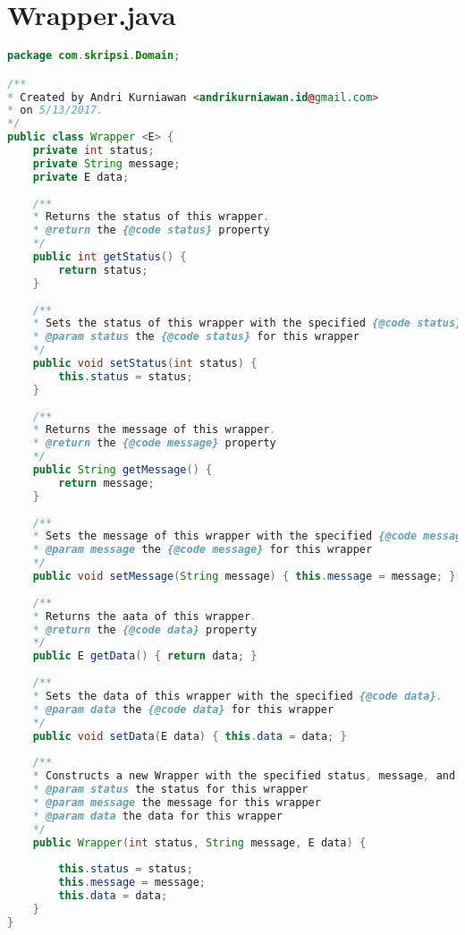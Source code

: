 \section*{Wrapper.java}
\begin{lstlisting}[caption={Berkas Wrapper.java},label={lst:Wrapper},language=Java]
package com.skripsi.Domain;

/**
* Created by Andri Kurniawan <andrikurniawan.id@gmail.com>
* on 5/13/2017.
*/
public class Wrapper <E> {
	private int status;
	private String message;
	private E data;
	
	/**
	* Returns the status of this wrapper.
	* @return the {@code status} property
	*/
	public int getStatus() {
		return status;
	}
	
	/**
	* Sets the status of this wrapper with the specified {@code status}.
	* @param status the {@code status} for this wrapper
	*/
	public void setStatus(int status) {
		this.status = status;
	}
	
	/**
	* Returns the message of this wrapper.
	* @return the {@code message} property
	*/
	public String getMessage() {
		return message;
	}
	
	/**
	* Sets the message of this wrapper with the specified {@code message}.
	* @param message the {@code message} for this wrapper
	*/
	public void setMessage(String message) { this.message = message; }
	
	/**
	* Returns the aata of this wrapper.
	* @return the {@code data} property
	*/
	public E getData() { return data; }
	
	/**
	* Sets the data of this wrapper with the specified {@code data}.
	* @param data the {@code data} for this wrapper
	*/
	public void setData(E data) { this.data = data; }
	
	/**
	* Constructs a new Wrapper with the specified status, message, and data.
	* @param status the status for this wrapper
	* @param message the message for this wrapper
	* @param data the data for this wrapper
	*/
	public Wrapper(int status, String message, E data) {
	
		this.status = status;
		this.message = message;
		this.data = data;
	}
}

\end{lstlisting}

\newpage
